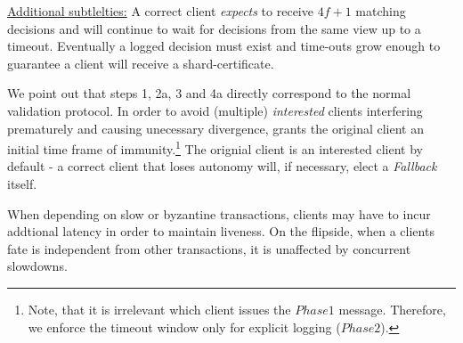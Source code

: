 \underline{Additional subtlelties:} A correct client \textit{expects} to receive $4f+1$ matching decisions and will continue to wait for decisions from the same view up to a timeout. Eventually a logged decision must exist and time-outs grow enough to guarantee a client will receive a shard-certificate. \\

We point out that steps 1, 2a, 3 and 4a directly correspond to the normal validation protocol. In order to avoid (multiple) \textit{interested} clients interfering prematurely and causing unecessary divergence, \sys grants the original client an initial time frame of immunity.\footnote{Note, that it is irrelevant which client issues the $Phase1$ message. Therefore, we enforce the timeout window only for explicit logging ($Phase2$).} The orignial client is an interested client by default - a correct client that loses autonomy will, if necessary, elect a \textit{Fallback} itself. 

When depending on slow or byzantine transactions, clients may have to incur addtional latency in order to maintain liveness. On the flipside, when a clients fate is independent from other transactions, it is unaffected by concurrent slowdowns. 
